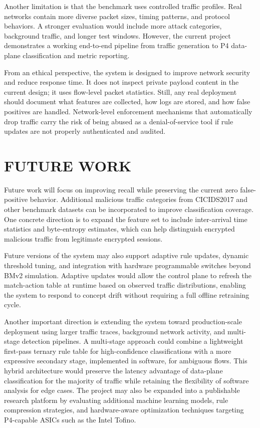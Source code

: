 \documentclass[conference]{IEEEtran}
\begin{document}
Another limitation is that the benchmark uses controlled
traffic profiles. Real networks contain more diverse packet
sizes, timing patterns, and protocol behaviors. A stronger
evaluation would include more attack categories, background
traffic, and longer test windows. However, the current project
demonstrates a working end-to-end pipeline from traffic
generation to P4 data-plane classification and metric reporting.

From an ethical perspective, the system is designed to
improve network security and reduce response time. It does
not inspect private payload content in the current design; it
uses flow-level packet statistics. Still, any real deployment
should document what features are collected, how logs are
stored, and how false positives are handled. Network-level
enforcement mechanisms that automatically drop traffic carry
the risk of being abused as a denial-of-service tool if rule
updates are not properly authenticated and audited.

\section{FUTURE WORK}

Future work will focus on improving recall while preserving
the current zero false-positive behavior. Additional malicious
traffic categories from CICIDS2017 and other benchmark
datasets can be incorporated to improve classification coverage.
One concrete direction is to expand the feature set to include
inter-arrival time statistics and byte-entropy estimates, which
can help distinguish encrypted malicious traffic from
legitimate encrypted sessions.

Future versions of the system may also support adaptive rule
updates, dynamic threshold tuning, and integration with
hardware programmable switches beyond BMv2 simulation.
Adaptive updates would allow the control plane to refresh
the match-action table at runtime based on observed traffic
distributions, enabling the system to respond to concept drift
without requiring a full offline retraining cycle.

Another important direction is extending the system toward
production-scale deployment using larger traffic traces,
background network activity, and multi-stage detection
pipelines. A multi-stage approach could combine a
lightweight first-pass ternary rule table for high-confidence
classifications with a more expressive secondary stage,
implemented in software, for ambiguous flows. This hybrid
architecture would preserve the latency advantage of
data-plane classification for the majority of traffic while
retaining the flexibility of software analysis for edge cases.
The project may also be expanded into a publishable research
platform by evaluating additional machine learning models,
rule compression strategies, and hardware-aware optimization
techniques targeting P4-capable ASICs such as the Intel
Tofino.
\end{document}
